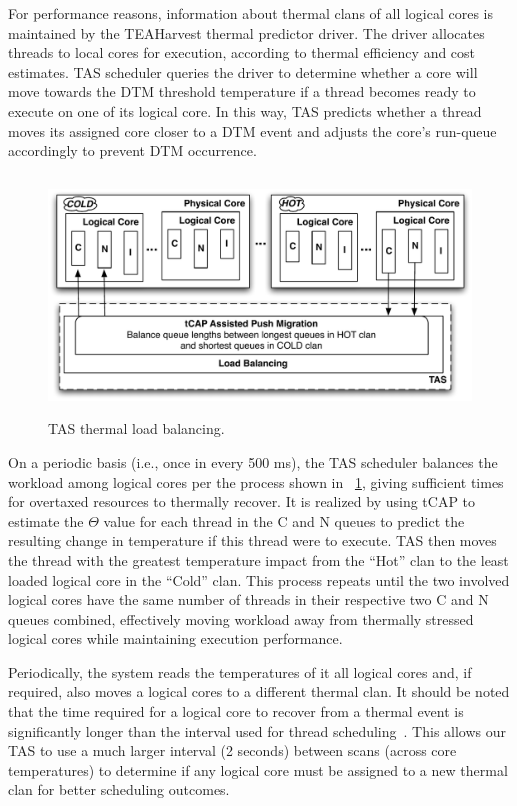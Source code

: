 \documentclass[times, 10pt,twocolumn]{IEEEtran}
\begin{document}
For performance reasons, information about thermal clans of all logical
cores is maintained by the TEAHarvest thermal predictor driver.  The
driver allocates threads to local cores for execution, according to
thermal efficiency and cost estimates.  TAS scheduler queries the driver
to determine whether a core will move towards the DTM threshold
temperature if a thread becomes ready to execute on one of its logical
core.  In this way, TAS predicts whether a thread moves its assigned
core closer to a DTM event and adjusts the core's run-queue accordingly
to prevent DTM occurrence.

\begin{figure}[t]
  \centering
  \includegraphics[width=1.0\linewidth,height=2.5in]{thbalance}
  \caption{TAS thermal load balancing.}
  \label{fig:tasbalance}
\end{figure}
On a periodic basis (i.e., once in every 500 ms), the TAS scheduler
balances the workload among logical cores per the process shown in
\figurename~\ref{fig:tasbalance}, giving sufficient times for overtaxed
resources to thermally recover.  It is realized by using tCAP to
estimate the $\Theta$ value for each thread in the C and N queues to
predict the resulting change in temperature if this thread were to
execute.  TAS then moves the thread with the greatest temperature impact
from the ``Hot'' clan to the least loaded logical core in the ``Cold''
clan. This process repeats until the two involved logical cores have the
same number of threads in their respective two C and N queues combined,
effectively moving workload away from thermally stressed logical cores
while maintaining execution performance.

Periodically, the system reads the temperatures of it all logical cores
and, if required, also moves a logical cores to a different thermal
clan.  It should be noted that the time required for a logical core to
recover from a thermal event is significantly longer than the interval
used for thread scheduling~\cite{Choi2007}. This allows our TAS to use a
much larger interval (2 seconds) between scans (across core
temperatures) to determine if any logical core must be assigned to a new
thermal clan for better scheduling outcomes.
\end{document}
